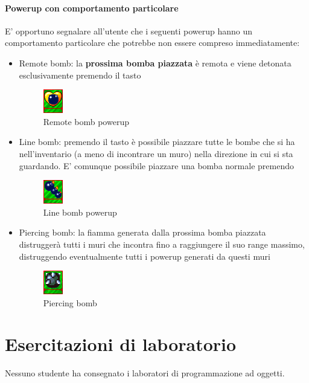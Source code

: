 \documentclass[a4paper,12pt]{report}
\begin{document}
\label{sec:puexpl}\subsubsection{Powerup con comportamento particolare}
E' opportuno segnalare all'utente che i seguenti powerup hanno un comportamento particolare che potrebbe non essere compreso immediatamente:
\begin{itemize}
    \item{Remote bomb: la \textbf{prossima bomba piazzata} è remota e viene detonata esclusivamente premendo il tasto }
    \begin{figure}[h]
        \centering{}
        \includegraphics{img/powerups/bomb_remote.png}
        \caption{Remote bomb powerup}
    \end{figure}
    \item{Line bomb: premendo il tasto  è possibile piazzare tutte le bombe che si ha nell'inventario (a meno di incontrare un muro) nella direzione in cui si sta guardando. E' comunque possibile piazzare una bomba normale premendo }
    \begin{figure}[h]
        \centering{}
        \includegraphics{img/powerups/line_bomb.png}
        \caption{Line bomb powerup}
    \end{figure}
    \item{Piercing bomb: la fiamma generata dalla prossima bomba piazzata distruggerà tutti i muri che incontra fino a raggiungere il suo range massimo, distruggendo eventualmente tutti i powerup generati da questi muri}
    \begin{figure}[h]
        \centering{}
        \includegraphics{img/powerups/bomb_pierce.png}
        \caption{Piercing bomb}
    \end{figure}
\end{itemize}
\chapter{Esercitazioni di laboratorio} 
Nessuno studente ha consegnato i laboratori di programmazione ad oggetti. 
\end{document}
